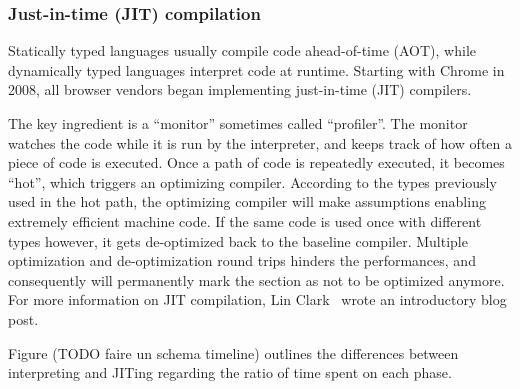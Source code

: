 \subsubsection{Just-in-time (JIT) compilation}%
\label{ssub:just_in_time_jit_compilation}

Statically typed languages usually compile code ahead-of-time (AOT),
while dynamically typed languages interpret code at runtime.
Starting with Chrome in 2008, all browser vendors began implementing
just-in-time (JIT) compilers.

The key ingredient is a ``monitor'' sometimes called ``profiler''.
The monitor watches the code while it is run by the interpreter,
and keeps track of how often a piece of code is executed.
Once a path of code is repeatedly executed, it becomes ``hot'',
which triggers an optimizing compiler.
According to the types previously used in the hot path,
the optimizing compiler will make assumptions enabling
extremely efficient machine code.
If the same code is used once with different types however,
it gets de-optimized back to the baseline compiler.
Multiple optimization and de-optimization round trips
hinders the performances, and consequently will permanently mark
the section as not to be optimized anymore.
For more information on JIT compilation, Lin Clark~\cite{clark-jit}
wrote an  introductory blog post.

Figure (\alert{TODO faire un schema timeline}) outlines the differences between
interpreting and JITing regarding the ratio of time spent on each phase.

%
%
%


